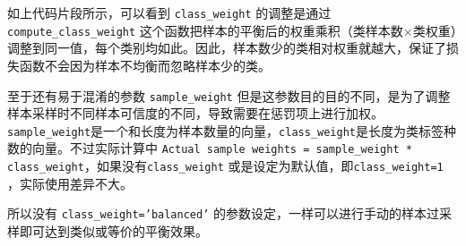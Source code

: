 \documentclass[a4paper]{article}
\begin{document}
如上代码片段所示，可以看到 \texttt{class\_weight} 的调整是通过 \texttt{compute\_class\_weight} 这个函数把样本的平衡后的权重乘积（类样本数$\times$类权重）调整到同一值，每个类别均如此。因此，样本数少的类相对权重就越大，保证了损失函数不会因为样本不均衡而忽略样本少的类。

至于还有易于混淆的参数 \texttt{sample\_weight} 但是这参数目的目的不同，是为了调整样本采样时不同样本可信度的不同，导致需要在惩罚项上进行加权。\texttt{sample\_weight}是一个和长度为样本数量的向量，\texttt{class\_weight}是长度为类标签种数的向量。不过实际计算中 \texttt{Actual sample weights = sample\_weight *  class\_weight}，如果没有\texttt{class\_weight} 或是设定为默认值，即\texttt{class\_weight=1} ，实际使用差异不大。

所以没有 \texttt{class\_weight='balanced'} 的参数设定，一样可以进行手动的样本过采样即可达到类似或等价的平衡效果。





\end{document}
